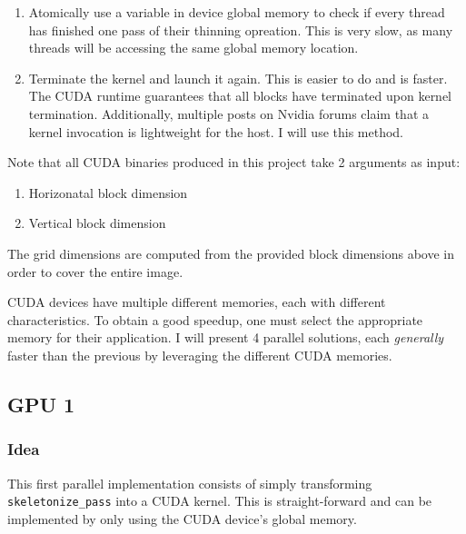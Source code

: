 \documentclass[11pt,a4paper]{article}
\begin{document}
        \begin{enumerate}
            \item Atomically use a variable in device global memory to check if every thread has finished one pass of their thinning opreation. This is very slow, as many threads will be accessing the same global memory location.
            \item Terminate the kernel and launch it again. This is easier to do and is faster. The CUDA runtime guarantees that all blocks have terminated upon kernel termination. Additionally, multiple posts on Nvidia forums claim that a kernel invocation is lightweight for the host. I will use this method.
        \end{enumerate}

        Note that all CUDA binaries produced in this project take 2 arguments as input:

        \begin{enumerate}
            \item Horizonatal block dimension
            \item Vertical block dimension
        \end{enumerate}

        The grid dimensions are computed from the provided block dimensions above in order to cover the entire image.

        CUDA devices have multiple different memories, each with different characteristics.
        To obtain a good speedup, one must select the appropriate memory for their application.
        I will present 4 parallel solutions, each \emph{generally} faster than the previous by leveraging the different CUDA memories.

        \subsection{GPU 1}
            \label{sec:solution_1}

            \subsubsection{Idea}
                This first parallel implementation consists of simply transforming \verb+skeletonize_pass+ into a CUDA kernel.
                This is straight-forward and can be implemented by only using the CUDA device's global memory.

\end{document}
